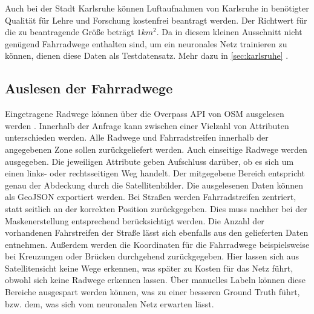 Auch bei der Stadt Karlsruhe können Luftaufnahmen von Karlsruhe in benötigter Qualität für Lehre und Forschung kostenfrei beantragt werden.
Der Richtwert für die zu beantragende Größe beträgt $1km^2$.
Da in diesem kleinen Ausschnitt nicht genügend Fahrradwege enthalten sind, um ein neuronales Netz trainieren zu können, dienen diese Daten als Testdatensatz.
Mehr dazu in \autoref{sec:karlsruhe} \cite{.04.12.2022}.

\subsection{Auslesen der Fahrradwege} \label{subsec:overpass-api}

Eingetragene Radwege können über die Overpass API von \ac{OSM} ausgelesen werden \cite{.05.10.2021}.
Innerhalb der Anfrage kann zwischen einer Vielzahl von Attributen unterschieden werden.
Alle Radwege und Fahrradstreifen innerhalb der angegebenen Zone sollen zurückgeliefert werden.
Auch einseitige Radwege werden ausgegeben. 
Die jeweiligen Attribute geben Aufschluss darüber, ob es sich um einen links- oder rechtsseitigen Weg handelt.
Der mitgegebene Bereich entspricht genau der Abdeckung durch die Satellitenbilder.
Die ausgelesenen Daten können als GeoJSON exportiert werden.
Bei Straßen werden Fahrradstreifen zentriert, statt seitlich an der korrekten Position zurückgegeben.
Dies muss nachher bei der Maskenerstellung entsprechend berücksichtigt werden. Die Anzahl der vorhandenen Fahrstreifen der Straße lässt sich ebenfalls aus den gelieferten Daten entnehmen.
Außerdem werden die Koordinaten für die Fahrradwege beispielsweise bei Kreuzungen oder Brücken durchgehend zurückgegeben. 
Hier lassen sich aus Satellitensicht keine Wege erkennen, was später zu Kosten für das Netz führt, obwohl sich keine Radwege erkennen lassen.
Über manuelles Labeln können diese Bereiche ausgespart werden können, was zu einer besseren Ground Truth führt, bzw. dem, was sich vom neuronalen Netz erwarten lässt.

